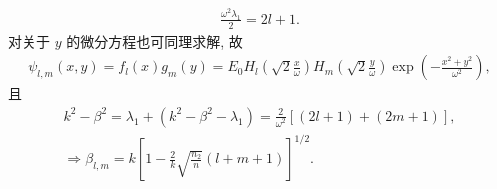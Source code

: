 \documentclass[twoside]{note}
\begin{document}
\begin{pf}
    \begin{align}
        \frac{\omega^2\lambda_1}{2}=2l+1.
    \end{align}
    对关于 $y$ 的微分方程也可同理求解, 故
    \begin{align}
        \psi_{l,m}(x,y)=f_l(x)g_m(y)=E_0H_l\left(\sqrt{2}\frac{x}{\omega}\right)H_m\left(\sqrt{2}\frac{y}{\omega}\right)\exp\left(-\frac{x^2+y^2}{\omega^2}\right),
    \end{align}
    且
    \begin{gather}
        k^2-\beta^2=\lambda_1+(k^2-\beta^2-\lambda_1)=\frac{2}{\omega^2}[(2l+1)+(2m+1)],\\
        \Longrightarrow\beta_{l,m}=k\left[1-\frac{2}{k}\sqrt{\frac{n_2}{n}}(l+m+1)\right]^{1/2}.
    \end{gather}
\end{pf}
\ifx\allfiles\undefined
\end{document}
